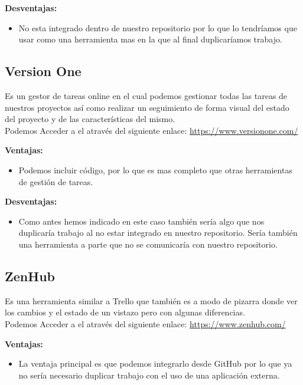 \textbf{Desventajas:}

\begin{itemize}
\item No esta integrado dentro de nuestro repositorio por lo que lo tendríamos que usar como una herramienta mas en la que al final duplicaríamos trabajo.
\end{itemize}


\subsection{Version One}
Es un gestor de tareas online en el cual podemos gestionar todas las tareas de nuestros proyectos así como realizar un seguimiento de forma visual del estado del proyecto y de las características del mismo.\\ 
Podemos Acceder a el através del siguiente enlace: 
\url{https://www.versionone.com/}


\textbf{Ventajas:}

\begin{itemize}
\item Podemos incluir código, por lo que es mas completo que otras herramientas de gestión de tareas.
\end{itemize}

\textbf{Desventajas:}

\begin{itemize}
\item Como antes hemos indicado en este caso también sería algo que nos duplicaría trabajo al no estar integrado en nuestro repositorio. Sería también una herramienta a parte que no se comunicaría con nuestro repositorio.
\end{itemize}


\subsection{ZenHub}
Es una herramienta similar a Trello que también es a modo de pizarra donde ver los cambios y el estado de un vistazo pero con algunas diferencias.\\
Podemos Acceder a el através del siguiente enlace: 
\url{https://www.zenhub.com/}



\textbf{Ventajas:}

\begin{itemize}
\item La ventaja principal es que podemos integrarlo desde GitHub por lo que ya no sería necesario duplicar trabajo con el uso de una aplicación externa.
\end{itemize}


